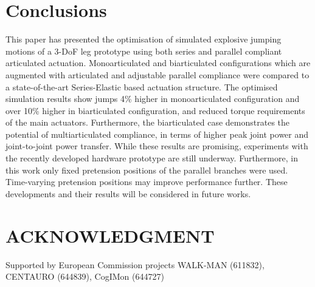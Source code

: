 \documentclass[letterpaper, 10 pt, conference]{ieeeconf}  %
\begin{document}
\section{Conclusions} \label{sec:conclusions} 
This paper has presented the optimisation of simulated explosive jumping motions of a 3-DoF leg prototype using both series and parallel compliant articulated actuation. Monoarticulated and biarticulated configurations which are augmented with articulated and adjustable parallel compliance were compared to a state-of-the-art Series-Elastic based actuation structure. The optimised simulation results show jumps 4\% higher in monoarticulated configuration and over 10\% higher in biarticulated configuration, and reduced torque requirements of the main actuators. Furthermore, the biarticulated case demonstrates the potential of multiarticulated compliance, in terms of higher peak joint power and joint-to-joint power transfer. While these results are promising, experiments with the recently developed hardware prototype are still underway. Furthermore, in this work only fixed pretension positions of the parallel branches were used. Time-varying pretension positions may improve performance further. These developments and their results will be considered in future works.


\addtolength{\textheight}{-0cm}   %


\section{ACKNOWLEDGMENT}
Supported by European Commission projects WALK-MAN (611832), CENTAURO (644839), CogIMon (644727)



\end{document}
